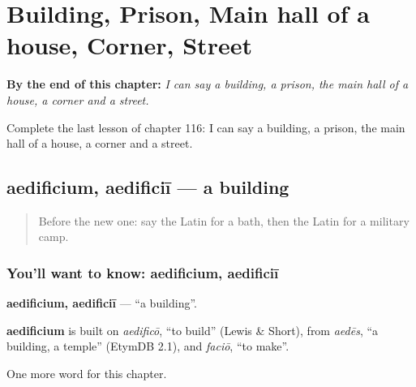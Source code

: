 
\chapter{Building, Prison, Main hall of a house, Corner, Street}
\label{ch:la-building-prison-main-hall-of-a-house-corner-street}

\begin{chapteropening}
\textbf{By the end of this chapter:} \emph{I can say a building, a prison, the main hall of a house, a corner and a street.}

Complete the last lesson of chapter 116: I can say a building, a prison, the main hall of a house, a corner and a street.
\end{chapteropening}

\section[aedificium, aedificiī]{aedificium, aedificiī — a building}

\label{lesson:LA-C116-aedificium}



\begin{quote}
Before the new one: say the Latin for a bath, then the Latin for a military camp.
\end{quote}

\subsection*{You'll want to know: aedificium, aedificiī}
\textbf{aedificium, aedificiī} — \textquotedblleft{}a building\textquotedblright{}.

\begin{cousinweb}
\textbf{aedificium} is built on \emph{aedificō}, \textquotedblleft{}to build\textquotedblright{} (Lewis \& Short), from \emph{aedēs}, \textquotedblleft{}a building, a temple\textquotedblright{} (EtymDB 2.1), and \emph{faciō}, \textquotedblleft{}to make\textquotedblright{}.
\end{cousinweb}

\begin{grammarlens}[title={What you've built}]
One more word for this chapter.
\end{grammarlens}

